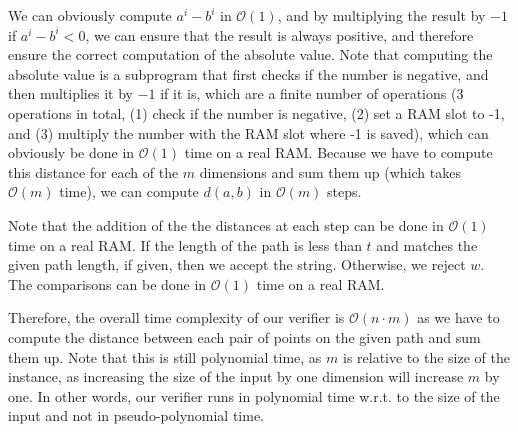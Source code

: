 \documentclass{article}
\begin{document}
We can obviously compute $a^i - b^i$ in $\mathcal{O}(1)$, and by multiplying the result by $-1$ if $a^i - b^i < 0$, we can ensure that the result is always positive, and therefore ensure the correct computation of the absolute value. Note that computing the absolute value is a subprogram that first checks if the number is negative, and then multiplies it by $-1$ if it is, which are a finite number of operations (3 operations in total, (1) check if the number is negative, (2) set a RAM slot to -1, and (3) multiply the number with the RAM slot where -1 is saved), which can obviously be done in $\mathcal{O}(1)$ time on a real RAM.
Because we have to compute this distance for each of the $m$ dimensions and sum them up (which takes $\mathcal{O}(m)$ time), we can compute $d(a, b)$ in $\mathcal{O}(m)$ steps. 



Note that the addition of the the distances at each step can be done in $\mathcal{O}(1)$ time on a real RAM. 
If the length of the path is less than $t$ and matches the given path length, if given, then we accept the string. Otherwise, we reject $w$. The comparisons can be done in $\mathcal{O}(1)$ time on a real RAM.

Therefore, the overall time complexity of our verifier is $\mathcal{O}(n \cdot m)$ as we have to compute the distance between each pair of points on the given path and sum them up. Note that this is still polynomial time, as $m$ is relative to the size of the instance, as increasing the size of the input by one dimension will increase $m$ by one. In other words, our verifier runs in polynomial time w.r.t. to the size of the input and not in pseudo-polynomial time.
\end{document}
